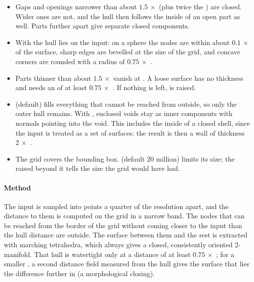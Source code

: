 \begin{itemize}
  \item Gaps and openings narrower than about $1.5\,\times$  (plus twice the
    ) are closed. Wider ones are not, and the hull then follows the inside of an
    open part as well. Parts further apart give separate closed components.
  \item With  the hull lies on the input: on a sphere the nodes are within about
    $0.1\,\times$  of the surface, sharp edges are bevelled at the size of the
    grid, and concave corners are rounded with a radius of $0.75\,\times$ .
  \item Parts thinner than about $1.5\,\times$  vanish at . A
    loose surface has no thickness and needs an  of at least $0.75\,\times$
    . If nothing is left,  is raised.
  \item {} (default) fills everything that cannot be reached from outside,
    so only the outer hull remains. With , enclosed voids stay as inner components
    with normals pointing into the void. This includes the inside of a closed shell, since the
    input is treated as a set of surfaces: the result is then a wall of thickness
    $2\,\times$ .
  \item The grid covers the bounding box.  (default 20 million) limits its
    size; the  raised beyond it tells the size the grid would have had.
\end{itemize}

\paragraph{Method} The input is sampled into points a quarter of the resolution apart, and the
distance to them is computed on the grid in a narrow band. The nodes that can be reached from
the border of the grid without coming closer to the input than the hull distance are outside.
The surface between them and the rest is extracted with marching tetrahedra, which always gives
a closed, consistently oriented 2-manifold. That hull is watertight only at a distance of at
least $0.75\,\times$ ; for a smaller , a second distance field
measured from the hull gives the surface that lies the difference further in (a morphological
closing).

